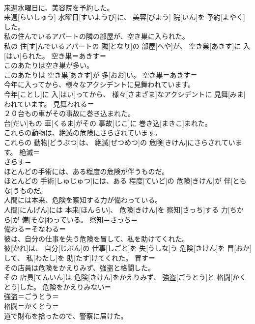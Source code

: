 \documentclass[8pt]{extreport}
\begin{document}
\begin{CJK}{UTF8}{min}
\\	来週水曜日に、美容院を予約した。	
\\	来週[らいしゅう] 水曜日[すいようび]に、 美容[びよう] 院[いん]を 予約[よやく]した。	
\\	私の住んでいるアパートの隣の部屋が、空き巣に入られた。	
\\	私の 住[す]んでいるアパートの 隣[となり]の 部屋[へや]が、 空き巣[あきす]に 入[はい]られた。	空き巣＝あきす＝ 
\\	このあたりは空き巣が多い。	
\\	このあたりは 空き巣[あきす]が 多[おお]い。	空き巣＝あきす＝ 
\\	今年に入ってから、様々なアクシデントに見舞われています。	
\\	今年[ことし]に 入[はい]ってから、 様々[さまざま]なアクシデントに 見舞[みま]われています。	見舞われる＝ 
\\	２０台もの車がその事故に巻き込まれた。	
\\	台[だい]もの 車[くるま]がその 事故[じこ]に 巻き込[まきこ]まれた。	
\\	これらの動物は、絶滅の危険にさらされています。	
\\	これらの 動物[どうぶつ]は、 絶滅[ぜつめつ]の 危険[きけん]にさらされています。	絶滅＝ 
\\	さらす＝ 
\\	ほとんどの手術には、ある程度の危険が伴うものだ。	
\\	ほとんどの 手術[しゅじゅつ]には、ある 程度[ていど]の 危険[きけん]が 伴[ともな]うものだ。	
\\	人間には本来、危険を察知する力が備わっている。	
\\	人間[にんげん]には 本来[ほんらい]、 危険[きけん]を 察知[さっち]する 力[ちから]が 備[そな]わっている。	察知＝さっち＝ 
\\	備わる＝そなわる＝ 
\\	彼は、自分の仕事を失う危険を冒して、私を助けてくれた。	
\\	彼[かれ]は、 自分[じぶん]の 仕事[しごと]を 失[うしな]う 危険[きけん]を 冒[おか]して、 私[わたし]を 助[たす]けてくれた。	冒す＝ 
\\	その店員は危険をかえりみず、強盗と格闘した。	
\\	その 店員[てんいん]は 危険[きけん]をかえりみず、 強盗[ごうとう]と 格闘[かくとう]した。	危険をかえりみない＝ 
\\	強盗＝ごうとう＝ 
\\	格闘＝かくとう＝ 
\\	道で財布を拾ったので、警察に届けた。	

\end{CJK}
\end{document}
